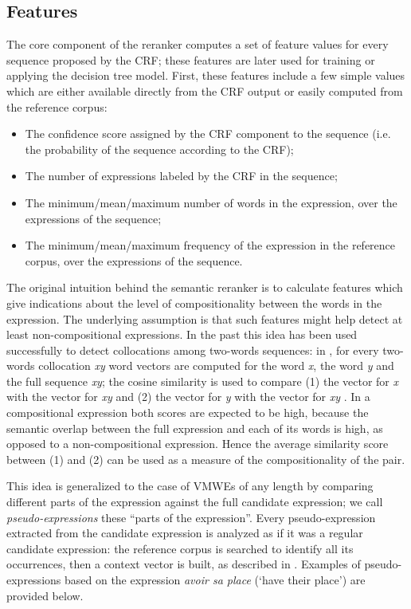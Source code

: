 \documentclass[output=paper
,modfonts
,nonflat]{langsci/langscibook}
\begin{document}
\subsection{Features}


The core component of the reranker computes a set of feature values
for every sequence proposed by the CRF; these features are later used
for training or applying the decision tree model. First, these
features include a few simple values which are either available
directly from the CRF output or easily computed from the reference
corpus:

\begin{itemize}
\item The confidence score assigned by the CRF component to the
  sequence (i.e. the probability of the sequence according to the
  CRF);
\item The number of expressions labeled by the CRF in the sequence;
\item The minimum/mean/maximum number of words in the expression,
  over the expressions of the sequence;
\item The minimum/mean/maximum frequency of the expression in the
  reference corpus, over the expressions of the sequence.
\end{itemize}

The original intuition behind the semantic reranker is to calculate
features which give indications about the level of compositionality
between the words in the expression.  The underlying assumption is
that such features might help detect at least non-compositional
expressions. In the past this idea has been used successfully to
detect collocations among two-words sequences: in
\cite{maldonado2011}, for every two-words collocation {\em xy} word
vectors are computed for the word {\em x}, the word {\em y} and the
full sequence {\em xy}; the cosine similarity is used to compare (1)
the vector for {\em x} with the vector for {\em xy} and (2) the vector
for {\em y} with the vector for {\em xy }. In a compositional
expression both scores are expected to be high, because the semantic
overlap between the full expression and each of its words is high, as
opposed to a non-compositional expression. Hence the average
similarity score between (1) and (2) can be used as a measure of the
compositionality of the pair.

This idea is generalized to the case of VMWEs of any length by
comparing different parts of the expression against the full candidate
expression; we call {\em pseudo-expressions} these ``parts of the
expression''. Every pseudo-expression extracted from the candidate
expression is analyzed as if it was a regular candidate expression:
the reference corpus is searched to identify all its occurrences, then
a context vector is built, as described in
. Examples of pseudo-expressions
based on the expression {\em avoir sa place} (`have their place') are
provided below.
\end{document}
